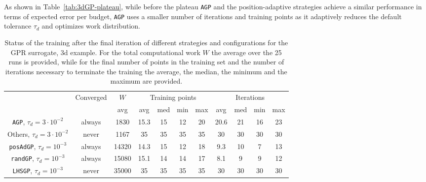 As shown in Table~\ref{tab:3dGP-plateau}, while before the plateau \texttt{AGP} and the position-adaptive strategies achieve a similar performance in terms of expected error per budget, \texttt{AGP} uses a smaller number of iterations and training points as it adaptively reduces the default tolerance $\tau_d$ and optimizes work distribution.

\begin{table}[H]
    \begin{centering}
        
    
    \begin{tabular}{ccccccccccc}
    \toprule
        & Converged & $W$  & \multicolumn{4}{c}{Training points} & \multicolumn{4}{c}{Iterations} \\ 
        &   &  avg  & avg   & med   & min   & max   & avg   & med   & min   & max \\
        \midrule
        \texttt{AGP}, $\tau_d = 3 \cdot 10 ^{-2}$    
        &always & 1830 & 15.3  &  15   &  12   &  20   &  20.6 &  21   &   16  & 23   \\
        Others, $\tau_d = 3 \cdot 10 ^{-2}$    
        & never & 1167 &  35   &  35   &  35   &   35  &   30  &  30   &   30  & 30   \\
        \texttt{posAdGP}, $\tau_d = 10 ^{-3}$ 
        & always&14320 & 14.3  &  15   &  12   &   18  &  9.3  &  10   &   7   & 13   \\
        \texttt{randGP}, $\tau_d = 10 ^{-3}$ 
        & always&15080 & 15.1  &  14   &  14   &   17  &  8.1  &  9    &   9   & 12 \\
        \texttt{LHSGP}, $\tau_d = 10 ^{-3}$ 
        & never &35000 &  35   &  35   &  35   &   35  &   30  &   30  &   30  & 30   \\
    \bottomrule
    \end{tabular}
    \caption{Status of the training after the final iteration of different strategies and configurations for the GPR surrogate, 3d example. For the total computational work $W$ the average over the 25 runs is provided, while for the final number of points in the training set and the number of iterations necessary to terminate the training the average, the median, the minimum and the maximum are provided.
    }
    \label{tab:3dGP-recap}
\end{centering}
\end{table}

